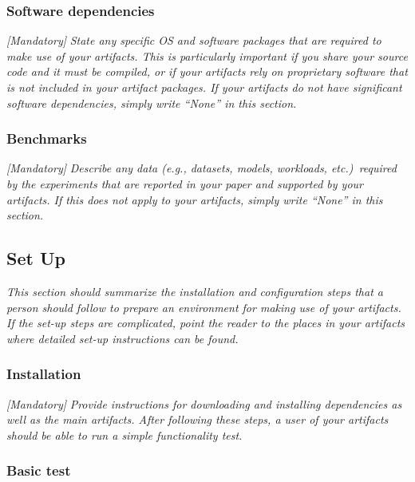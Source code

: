 
\subsubsection{Software dependencies}

\emph{[Mandatory]}
%
\emph{State any specific OS and software packages that are required to
make use of your artifacts.  This is particularly important if you
share your source code and it must be compiled, or if your artifacts
rely on proprietary software that is not included in your artifact
packages.  If your artifacts do not have significant software
dependencies, simply write ``None'' in this section.}


\subsubsection{Benchmarks}

\emph{[Mandatory]}
%
\emph{Describe any data (e.g., datasets, models, workloads,
etc.)\ required by the experiments that are reported in your paper and
supported by your artifacts.  If this does not apply to your
artifacts, simply write ``None'' in this section.}


\subsection{Set Up}

\emph{This section should summarize the installation and configuration
steps that a person should follow to prepare an environment for making
use of your artifacts.  If the set-up steps are complicated, point the
reader to the places in your artifacts where detailed set-up
instructions can be found.}


\subsubsection{Installation}

\emph{[Mandatory]}
%
\emph{Provide instructions for downloading and installing dependencies
as well as the main artifacts.  After following these steps, a user of
your artifacts should be able to run a simple functionality test.}


\subsubsection{Basic test}

